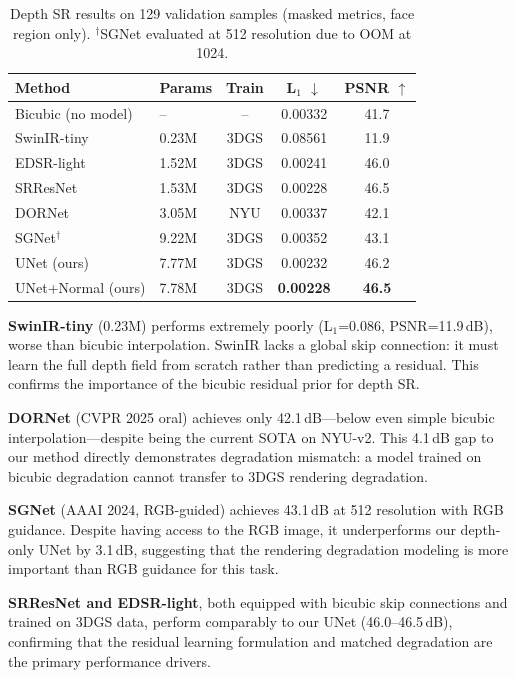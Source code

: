 \documentclass[10pt,twocolumn,letterpaper]{article}
\begin{document}
\begin{table}[t]
\centering
\caption{Depth SR results on 129 validation samples (masked metrics, face region only). $^\dagger$SGNet evaluated at 512 resolution due to OOM at 1024.}
\label{tab:baselines}
\small
\setlength{\tabcolsep}{4pt}
\begin{tabular}{@{}llccc@{}}
\toprule
Method & Params & Train & L$_1$ $\downarrow$ & PSNR $\uparrow$ \\
\midrule
Bicubic (no model) & -- & -- & 0.00332 & 41.7 \\
\midrule
SwinIR-tiny~\cite{liang2021swinir} & 0.23M & 3DGS & 0.08561 & 11.9 \\
EDSR-light~\cite{lim2017edsr} & 1.52M & 3DGS & 0.00241 & 46.0 \\
SRResNet~\cite{ledig2017srresnet} & 1.53M & 3DGS & 0.00228 & 46.5 \\
DORNet~\cite{yan2025dornet} & 3.05M & NYU & 0.00337 & 42.1 \\
SGNet$^\dagger$~\cite{yan2024sgnet} & 9.22M & 3DGS & 0.00352 & 43.1 \\
\midrule
UNet (ours) & 7.77M & 3DGS & 0.00232 & 46.2 \\
UNet+Normal (ours) & 7.78M & 3DGS & \textbf{0.00228} & \textbf{46.5} \\
\bottomrule
\end{tabular}
\vspace{-1em}
\end{table}

\textbf{SwinIR-tiny} (0.23M) performs extremely poorly (L$_1$=0.086, PSNR=11.9\,dB), worse than bicubic interpolation.
SwinIR lacks a global skip connection: it must learn the full depth field from scratch rather than predicting a residual.
This confirms the importance of the bicubic residual prior for depth SR.

\textbf{DORNet} (CVPR 2025 oral) achieves only 42.1\,dB---below even simple bicubic interpolation---despite being the current SOTA on NYU-v2.
This 4.1\,dB gap to our method directly demonstrates degradation mismatch: a model trained on bicubic degradation cannot transfer to 3DGS rendering degradation.

\textbf{SGNet} (AAAI 2024, RGB-guided) achieves 43.1\,dB at 512 resolution with RGB guidance.
Despite having access to the RGB image, it underperforms our depth-only UNet by 3.1\,dB, suggesting that the rendering degradation modeling is more important than RGB guidance for this task.

\textbf{SRResNet and EDSR-light}, both equipped with bicubic skip connections and trained on 3DGS data, perform comparably to our UNet (46.0--46.5\,dB), confirming that the residual learning formulation and matched degradation are the primary performance drivers.
\end{document}
